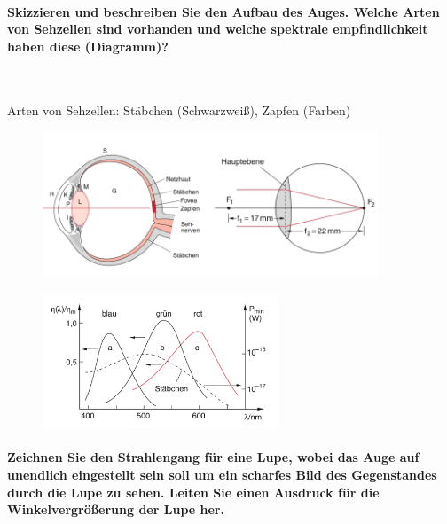 \documentclass[a4paper, 11pt, parskip=half]{scrartcl}
\begin{document}
\paragraph{Skizzieren und beschreiben Sie den Aufbau des Auges. Welche Arten von Sehzellen sind
vorhanden und welche spektrale empfindlichkeit haben diese (Diagramm)?} ~

Arten von Sehzellen: Stäbchen (Schwarzweiß), Zapfen (Farben)
\begin{figure}[H]
    \centering
    \includegraphics[width=10cm]{image/20/1.png}
\end{figure}
\begin{figure}[H]
    \centering
    \includegraphics[width=7cm]{image/20/2.png}
\end{figure}

\paragraph{Zeichnen Sie den Strahlengang für eine Lupe, wobei das Auge auf unendlich eingestellt
sein soll um ein scharfes Bild des Gegenstandes durch die Lupe zu sehen. Leiten Sie einen Ausdruck
für die Winkelvergrößerung der Lupe her.}~
\end{document}
